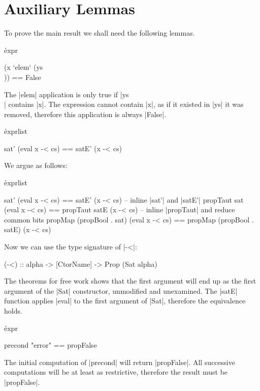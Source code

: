 \section{Auxiliary Lemmas}
\label{secP:general_lemmas}

To prove the main result we shall need the following lemmas.


\h{expr}\begin{code}
(x `elem` (ys \\ [x])) == False
\end{code}

The |elem| application is only true if |ys \\ [x]| contains |x|. The expression cannot contain |x|, as if it existed in |ys| it was removed, therefore this application is always |False|.



\h{exprlist}\begin{code}
sat' (eval x -< cs) == satE' (x -< cs)
\end{code}

We argue as follows:

\h{exprlist}\begin{code}
sat' (eval x -< cs) == satE' (x -< cs)
    -- \eq inline |sat'| and |satE'|
propTaut sat (eval x -< cs) == propTaut satE (x -< cs)
    -- \eq inline |propTaut| and reduce common bits
propMap (propBool . sat) (eval x -< cs) == propMap (propBool . satE) (x -< cs)
\end{code}

Now we can use the type signature of |-<|:

\begin{code}
(-<) :: alpha -> [CtorName] -> Prop (Sat alpha)
\end{code}

The theorems for free work \cite{wadler:theorems} shows that the first argument will end up as the first argument of the |Sat| constructor, unmodified and unexamined. The |satE| function applies |eval| to the first argument of |Sat|, therefore the equivalence holds.



\h{expr}\begin{code}
precond "error" == propFalse
\end{code}

The initial computation of |precond| will return |propFalse|. All successive computations will be at least as restrictive, therefore the result must be |propFalse|.


